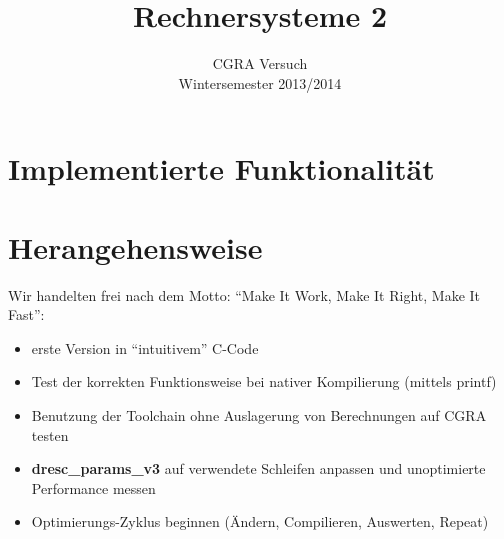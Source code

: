 \documentclass[oneside,11pt,accentcolor=tud2b, nochapname]{tudexercise}
\title{Rechnersysteme 2}
\subtitle{CGRA Versuch\\
Wintersemester 2013/2014}
\begin{document}
\maketitle

\section*{Implementierte Funktionalität}

\section*{Herangehensweise}
Wir handelten frei nach dem Motto: "`Make It Work, Make It Right, Make It Fast"':

\begin{itemize}
	\item erste Version in "`intuitivem"' C-Code
	\item Test der korrekten Funktionsweise bei nativer Kompilierung (mittels printf)
	\item Benutzung der Toolchain ohne Auslagerung von Berechnungen auf CGRA testen
	\item \textbf{dresc\_params\_v3} auf verwendete Schleifen anpassen und unoptimierte Performance messen
	\item Optimierungs-Zyklus beginnen (Ändern, Compilieren, Auswerten, Repeat)
\end{itemize}
\end{document}
